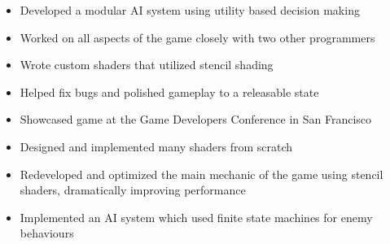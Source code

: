 \documentclass[10pt,a4paper]{altacv}
\begin{document}
\divider


\begin{itemize}
	
	\item Developed a modular AI system using utility based decision making
	\item Worked on all aspects of the game closely with two other programmers
	\item Wrote custom shaders that utilized stencil shading
	\item Helped fix bugs and polished gameplay to a releasable state
	\item Showcased game at the Game Developers Conference in San Francisco
\end{itemize}

\divider

\begin{itemize}
	
	\item Designed and implemented many shaders from scratch
	\item Redeveloped and optimized the main mechanic of the game using stencil shaders, dramatically improving performance
	\item Implemented an AI system which used finite state machines for enemy behaviours
\end{itemize}



\nocite{*}








\end{document}
